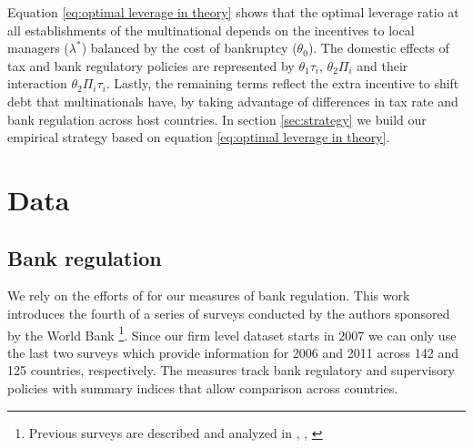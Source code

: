 \documentclass[12pt]{article}
\begin{document}
    Equation \ref{eq:optimal leverage in theory} shows that the optimal leverage ratio at all establishments of the multinational depends on the incentives to local managers ($\lambda^*$) balanced by the cost of bankruptcy ($\theta_0$). The domestic effects of tax and bank regulatory policies are represented by $\theta_1\tau_i$, $\theta_2\Pi_i$ and their interaction $\theta_2\Pi_i\tau_i$. Lastly, the remaining terms reflect the extra incentive to shift debt that multinationals have, by taking advantage of differences in tax rate and bank regulation across host countries. In section \ref{sec:strategy} we build our empirical strategy based on equation \ref{eq:optimal leverage in theory}.
    
	\section{Data} \label{sec:data}	
	\subsection{Bank regulation} \label{subsec:MPI}
	
	We rely on the efforts of \cite*{barth2013bank} for our measures of bank regulation. This work introduces the fourth of a series of surveys conducted by the authors sponsored by the World Bank \footnote{Previous surveys are described and analyzed in \cite{barth2001regulation}, \cite{barth2004bank}, \cite{barth2008bank}}. Since our firm level dataset starts in 2007 we can only use the last two surveys which provide information for 2006 and 2011 across 142 and 125 countries, respectively. The measures track bank regulatory and supervisory policies with summary indices that allow comparison across countries.
\end{document}
